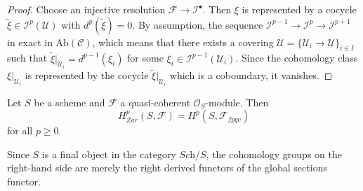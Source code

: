 \begin{proof}
Choose an injective resolution $\mathcal{F} \to \mathcal{I}^\bullet$. Then
$\xi$ is represented by a cocycle $\tilde{\xi} \in \mathcal{I}^p(\mathcal{U})$
with $d^p(\tilde{\xi}) = 0$. By assumption, the sequence $\mathcal{I}^{p-1} \to
\mathcal{I}^{p} \to \mathcal{I}^{p+1}$ in exact in $\text{Ab}(\mathcal{C})$,
which means that there exists a covering $\mathcal{U} = \{ \mathcal{U}_i \to
\mathcal{U} \}_{i \in I}$ such that $\tilde{\xi}|_{\mathcal{U}_i} =
d^{p-1}(\xi_i)$ for some $\xi_i \in \mathcal{I}^{p-1}(\mathcal{U}_i)$. Since
the cohomology class $\xi|_{\mathcal{U}_i}$ is represented by the cocycle
$\tilde{\xi}|_{\mathcal{U}_i}$ which is a coboundary, it vanishes.
\end{proof}

\begin{theorem}
\label{theorem-zariski-fpqc-quasi-coherent}
Let $S$ be a scheme and $\mathcal{F}$ a quasi-coherent $\mathcal{O}_S$-module.
Then
$$
H_{Zar}^p(S, \mathcal{F}) = H^p(S, \mathcal{F}_{fpqc})
$$
for all $p \geq 0$.
\end{theorem}

\begin{remark}
\label{remark-right-derived-global-sections}
Since $S$ is a final object in the category $\textit{Sch}/S$, the cohomology
groups on the right-hand side are merely the right derived functors of the
global sections functor.
\end{remark}

